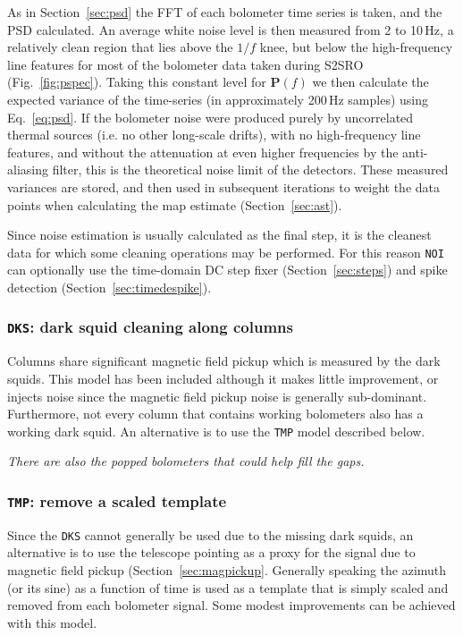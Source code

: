 \documentclass[useAMS,usenatbib,nofootinbib]{mn2e}
\newcommand{\model}[1]{\texttt{#1}}
\begin{document}
As in Section~\ref{sec:psd} the FFT of each bolometer time series is
taken, and the PSD calculated. An average white noise level is then
measured from 2 to 10\,Hz, a relatively clean region that lies above
the $1/f$ knee, but below the high-frequency line features for most of
the bolometer data taken during S2SRO (Fig.~\ref{fig:pspec}). Taking
this constant level for $\mathbf{P}(f)$ we then calculate the expected
variance of the time-series (in approximately 200\,Hz samples) using
Eq.~\ref{eq:psd}. If the bolometer noise were produced purely by
uncorrelated thermal sources (i.e. no other long-scale drifts), with
no high-frequency line features, and without the attenuation at even
higher frequencies by the anti-aliasing filter, this is the
theoretical noise limit of the detectors. These measured variances are
stored, and then used in subsequent iterations to weight the data
points when calculating the map estimate (Section~\ref{sec:ast}).

Since noise estimation is usually calculated as the final step, it is
the cleanest data for which some cleaning operations may be
performed. For this reason \model{NOI} can optionally use the
time-domain DC step fixer (Section~\ref{sec:steps}) and spike
detection (Section~\ref{sec:timedespike}).

\subsubsection{\model{DKS}: dark squid cleaning along columns}
\label{sec:dks}

Columns share significant magnetic field pickup which is measured by
the dark squids. This model has been included although it makes little
improvement, or injects noise since the magnetic field pickup noise is
generally sub-dominant. Furthermore, not every column that contains
working bolometers also has a working dark squid. An alternative is to
use the \model{TMP} model described below.

\textit{There are also the popped bolometers that could help fill the
gaps.}

\subsubsection{\model{TMP}: remove a scaled template}

Since the \model{DKS} cannot generally be used due to the missing
dark squids, an alternative is to use the telescope pointing as a
proxy for the signal due to magnetic field pickup
(Section~\ref{sec:magpickup}. Generally speaking the azimuth (or its
sine) as a function of time is used as a template that is simply
scaled and removed from each bolometer signal. Some modest
improvements can be achieved with this model.
\end{document}
